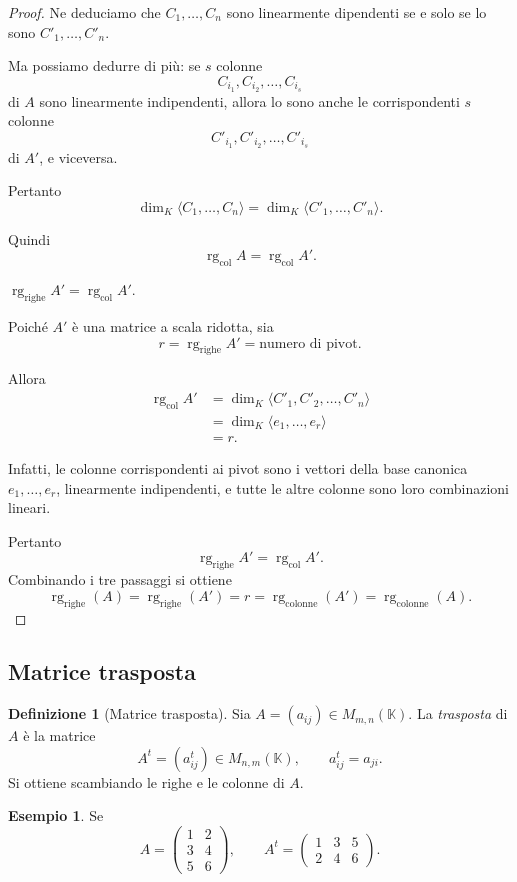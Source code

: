 \documentclass[11pt,a4paper]{article}
\newcommand{\KK}{\mathbb{K}}
\theoremstyle{plain}
\theoremstyle{definition}
\newtheorem{defn}[prop]{Definizione}
\newtheorem{esempio}[prop]{Esempio}
\theoremstyle{remark}
\begin{document}
\begin{proof}
Ne deduciamo che $C_1,\ldots,C_n$ sono
linearmente dipendenti se e solo se lo sono
$C'_1,\ldots,C'_n$.

Ma possiamo dedurre di più: se $s$ colonne
\[
C_{i_1},C_{i_2},\ldots,C_{i_s}
\]
di $A$ sono linearmente indipendenti,
allora lo sono anche le corrispondenti
$s$ colonne
\[
C'_{i_1},C'_{i_2},\ldots,C'_{i_s}
\]
di $A'$, e viceversa.

Pertanto
\[
\boxed{
\dim_K\langle C_1,\ldots,C_n\rangle
=
\dim_K\langle C'_1,\ldots,C'_n\rangle.
}
\]

Quindi
\[
\boxed{
\operatorname{rg}_{\mathrm{col}} A
=
\operatorname{rg}_{\mathrm{col}} A'.
}
\]
\item[c)] $\operatorname{rg}_{\mathrm{righe}} A'
=\operatorname{rg}_{\mathrm{col}} A'$.

Poiché $A'$ è una matrice a scala ridotta,
sia
\[
r=\operatorname{rg}_{\mathrm{righe}} A'
=\text{numero di pivot}.
\]

Allora
\[
\begin{aligned}
\operatorname{rg}_{\mathrm{col}} A'
&=\dim_K\langle C'_1,C'_2,\ldots,C'_n\rangle\\
&=\dim_K\langle e_1,\ldots,e_r\rangle\\
&=r.
\end{aligned}
\]

Infatti, le colonne corrispondenti ai pivot
sono i vettori della base canonica
$e_1,\ldots,e_r$, linearmente indipendenti,
e tutte le altre colonne sono loro
combinazioni lineari.

Pertanto
\[
\boxed{
\operatorname{rg}_{\mathrm{righe}} A'
=
\operatorname{rg}_{\mathrm{col}} A'.
}
\]
Combinando i tre passaggi si ottiene
\[
 \operatorname{rg}_{\mathrm{righe}}(A)
 =\operatorname{rg}_{\mathrm{righe}}(A')
 =r
 =\operatorname{rg}_{\mathrm{colonne}}(A')
 =\operatorname{rg}_{\mathrm{colonne}}(A).
\]
\end{proof}


\subsection{Matrice trasposta}

\begin{defn}[Matrice trasposta]
Sia $A=(a_{ij})\in M_{m,n}(\KK)$. La \emph{trasposta} di $A$ \`e la matrice
\[
 A^t=(a^t_{ij})\in M_{n,m}(\KK),\qquad a^t_{ij}=a_{ji}.
\]
Si ottiene scambiando le righe e le colonne di $A$.
\end{defn}

\begin{esempio}
Se
\[
 A=\begin{pmatrix}1&2\\3&4\\5&6\end{pmatrix},
 \qquad
 A^t=\begin{pmatrix}1&3&5\\2&4&6\end{pmatrix}.
\]
\end{esempio}
\end{document}
